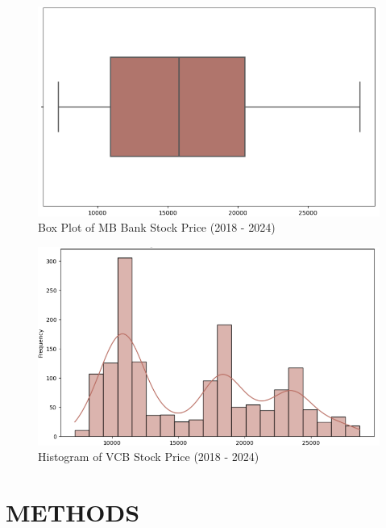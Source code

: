 \documentclass[conference]{IEEEtran}
\begin{document}
\begin{figure}[H]
  \centering
  \begin{minipage}{0.8\linewidth}
    \centering
        \includegraphics[width=\linewidth]{images/mbb_boxplot.png}
    \caption{Box Plot of MB Bank Stock Price (2018 - 2024)}
    \label{fig5}
  \end{minipage}
\end{figure}

\begin{figure}[H]
    \centering
    \begin{minipage}{0.8\linewidth}
    \centering
        \includegraphics[width=\linewidth]{images/mbb_histogram.png}
    \caption{Histogram of VCB Stock Price (2018 - 2024)}
    \label{fig6}
    \end{minipage}
\end{figure}


\section{METHODS}
\end{document}
